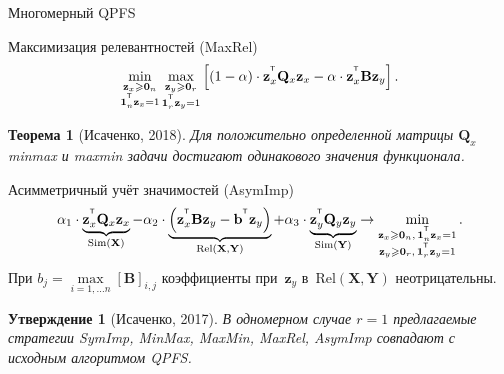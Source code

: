 \documentclass[9pt]{beamer}
\renewcommand{\geq}{\ensuremath{\geqslant}}
\newcommand{\bb}{\mathbf{b}}
\newcommand{\bz}{\mathbf{z}}
\newcommand{\bB}{\mathbf{B}}
\newcommand{\bQ}{\mathbf{Q}}
\newcommand{\bX}{\mathbf{X}}
\newcommand{\bY}{\mathbf{Y}}
\newcommand{\T}{^{\text{\tiny\sffamily\upshape\mdseries T}}}
\newcommand{\bOne}{\boldsymbol{1}}
\newcommand{\bZero}{\boldsymbol{0}}
\newtheorem{statement}{Утверждение}
\newtheorem{rustheorem}{Теорема}
\begin{document}
\begin{frame}{Многомерный QPFS}
	\begin{block}{Максимизация релевантностей (MaxRel)}
	\[
		\min_{\substack{\bz_x \geq \bZero_n \\ \bOne_n^{\T}\bz_x=1}} 	\max_{\substack{\bz_y \geq \bZero_r \\ \bOne_r^{\T}\bz_y=1}} \left[ (1 - \alpha) \cdot \bz_x^{\T} \bQ_x \bz_x - \alpha \cdot \bz_x^{\T} \bB \bz_y \right].
	\]
	\end{block}
	\begin{rustheorem}[Исаченко, 2018]
		Для положительно определенной матрицы $\bQ_x$ minmax и maxmin задачи достигают одинакового значения функционала.
	\end{rustheorem}
	\begin{block}{Асимметричный учёт значимостей (AsymImp)}
	\begin{equation*}
	\alpha_1 \cdot \underbrace{\bz_x^{\T} \bQ_x \bz_x}_{\text{Sim}(\bX)} - \alpha_2 \cdot  \underbrace{\left(\bz_x^{\T} \bB \bz_y - \bb^{\T} \bz_y \right) }_{\text{Rel}(\bX, \bY)} + \alpha_3 \cdot \underbrace{\bz_y^{\T} \bQ_y \bz_y}_{\text{Sim}(\bY)} \rightarrow \min_{\substack{\bz_x \geq \bZero_n, \, \bOne_n^{\T}\bz_x=1 \\ \bz_y \geq \bZero_r, \, \bOne_r^{\T}\bz_y=1}}.
	\end{equation*}
	При $b_j = \max\limits_{i=1, \dots n} [\bB]_{i, j}$ коэффициенты при~$\bz_y$ в~$\text{Rel}(\bX, \bY)$ неотрицательны.
	
	\begin{statement}[Исаченко, 2017]
		В одномерном случае $r=1$ предлагаемые стратегии SymImp, MinMax, MaxMin, MaxRel, AsymImp совпадают с исходным алгоритмом QPFS.
	\end{statement}
\end{block}
\end{frame}
\end{document}
